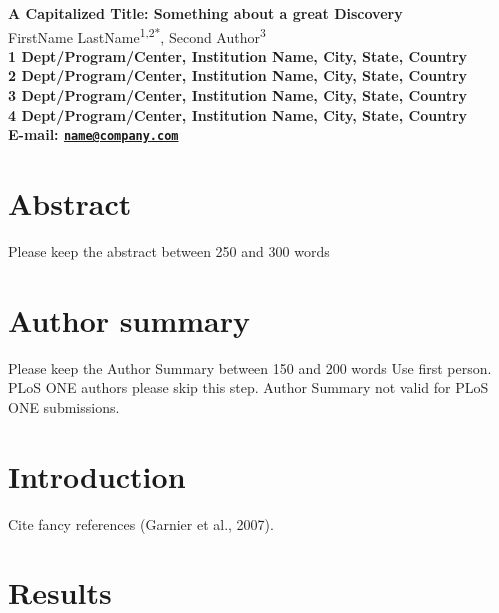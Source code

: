 \documentclass[10pt]{article}
\date{}
\begin{document}
\begin{flushleft}
{\Large
\textbf{A Capitalized Title: Something about a great Discovery}
}
\\
  FirstName LastName\textsuperscript{1,2*},
  Second Author\textsuperscript{3}\\
\bf{1} Dept/Program/Center, Institution Name,  City,  State,  Country
\\
\bf{2} Dept/Program/Center, Institution Name,  City,  State,  Country
\\
\bf{3} Dept/Program/Center, Institution Name,  City,  State,  Country
\\
\bf{4} Dept/Program/Center, Institution Name,  City,  State,  Country
\\

\textasteriskcentered{} E-mail:   \href{mailto:name@company.com}{\nolinkurl{name@company.com}}


\end{flushleft}

\section*{Abstract}\label{abstract}

Please keep the abstract between 250 and 300 words

\section*{Author summary}\label{author-summary}

Please keep the Author Summary between 150 and 200 words Use first
person. PLoS ONE authors please skip this step. Author Summary not valid
for PLoS ONE submissions.

\section*{Introduction}\label{introduction}

Cite fancy references (Garnier et al., 2007).

\section*{Results}\label{results}
\end{document}
